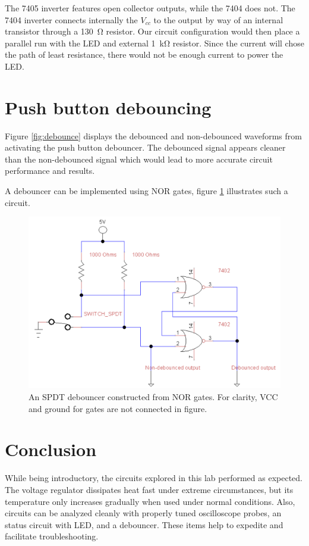 \documentclass[11pt]{article}
\begin{document}
The 7405 inverter features open collector outputs, while the 7404 does not. The 7404 inverter connects internally the $V_{cc}$ to the output by way of an internal transistor through a \SI{130}{\ohm} resistor. Our circuit configuration would then place a parallel run with the LED and external \SI{1}{\kilo\ohm} resistor. Since the current will chose the path of least resistance, there would not be enough current to power the LED. 

\section{Push button debouncing}

Figure \ref{fig:debounce} displays the debounced and non-debounced waveforms from activating the push button debouncer. The debounced signal appears cleaner than the non-debounced signal which would lead to more accurate circuit performance and results.

A debouncer can be implemented using NOR gates, figure \ref{fig:nor_gates} illustrates such a circuit. 

\begin{figure}[h]
	\centering
	\includegraphics[scale=0.5, draft=false]{nor_gates}
	\caption{An SPDT debouncer constructed from NOR gates. For clarity, VCC and ground for gates are not connected in figure.}
	\label{fig:nor_gates}
\end{figure}

\section{Conclusion}

While being introductory, the circuits explored in this lab performed as expected. The voltage regulator dissipates heat fast under extreme circumstances, but its temperature only increases gradually when used under normal conditions. Also, circuits can be analyzed cleanly with properly tuned oscilloscope probes, an status circuit with LED, and a debouncer. These items help to expedite and facilitate troubleshooting.
\end{document}

